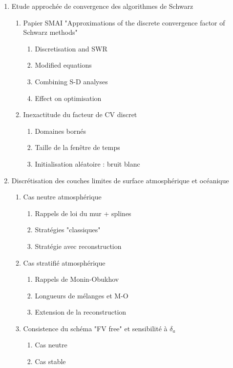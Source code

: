 \documentclass{article}
\begin{document}
\begin{enumerate}
\begin{enumerate}
	\end{enumerate}
\item Etude approchée de convergence des algorithmes de Schwarz
	\begin{enumerate}
		\item Papier SMAI "Approximations of the discrete
			convergence factor of Schwarz methods"
			\begin{enumerate}
					\item Discretisation and SWR
					\item Modified equations
					\item Combining S-D analyses
					\item Effect on optimisation
			\end{enumerate}
		\item Inexactitude du facteur de CV discret
			\begin{enumerate}
				\item Domaines bornés
				\item Taille de la fenêtre de temps
				\item Initialisation aléatoire :
					bruit blanc 	
			\end{enumerate}
	\end{enumerate}
\item Discrétisation des couches limites de surface atmosphérique
	et océanique
	\begin{enumerate}
		\item Cas neutre atmosphérique
			\begin{enumerate}
				\item Rappels de loi du mur + splines
				\item Stratégies "classiques"
				\item Stratégie avec reconstruction
			\end{enumerate}
		\item Cas stratifié atmosphérique
			\begin{enumerate}
				\item Rappels de Monin-Obukhov
				\item Longueurs de mélanges et M-O
				\item Extension de la reconstruction
			\end{enumerate}
		\item Consistence du schéma "FV free"
			et sensibilité à $\delta_a$
			\begin{enumerate}
				\item Cas neutre
				\item Cas stable

\end{enumerate}
\end{enumerate}
\end{enumerate}
\end{document}
